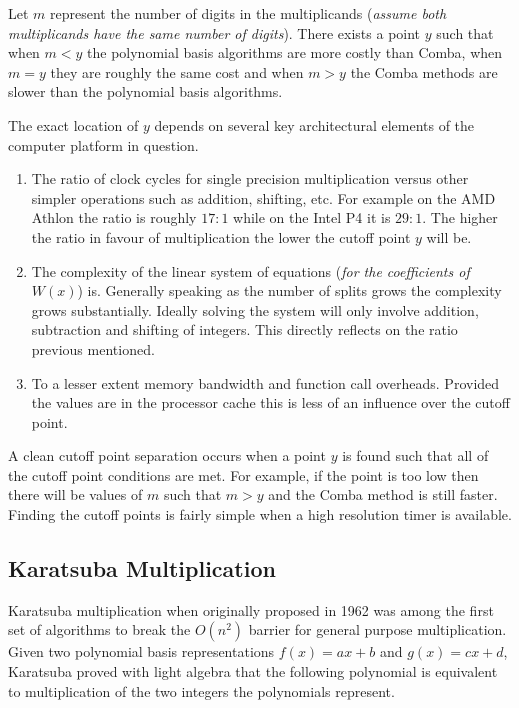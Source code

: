 \documentclass[b5paper]{book}
\begin{document}
Let $m$ represent the number of digits in the multiplicands (\textit{assume both multiplicands have the same number of digits}).  There exists a 
point $y$ such that when $m < y$ the polynomial basis algorithms are more costly than Comba, when $m = y$ they are roughly the same cost and 
when $m > y$ the Comba methods are slower than the polynomial basis algorithms.  

The exact location of $y$ depends on several key architectural elements of the computer platform in question.

\begin{enumerate}
\item  The ratio of clock cycles for single precision multiplication versus other simpler operations such as addition, shifting, etc.  For example
on the AMD Athlon the ratio is roughly $17 : 1$ while on the Intel P4 it is $29 : 1$.  The higher the ratio in favour of multiplication the lower
the cutoff point $y$ will be.  

\item  The complexity of the linear system of equations (\textit{for the coefficients of $W(x)$}) is.  Generally speaking as the number of splits
grows the complexity grows substantially.  Ideally solving the system will only involve addition, subtraction and shifting of integers.  This
directly reflects on the ratio previous mentioned.

\item  To a lesser extent memory bandwidth and function call overheads.  Provided the values are in the processor cache this is less of an
influence over the cutoff point.

\end{enumerate}

A clean cutoff point separation occurs when a point $y$ is found such that all of the cutoff point conditions are met.  For example, if the point
is too low then there will be values of $m$ such that $m > y$ and the Comba method is still faster.  Finding the cutoff points is fairly simple when
a high resolution timer is available.  

\subsection{Karatsuba Multiplication}
Karatsuba \cite{KARA} multiplication when originally proposed in 1962 was among the first set of algorithms to break the $O(n^2)$ barrier for
general purpose multiplication.  Given two polynomial basis representations $f(x) = ax + b$ and $g(x) = cx + d$, Karatsuba proved with 
light algebra \cite{KARAP} that the following polynomial is equivalent to multiplication of the two integers the polynomials represent.
\end{document}
